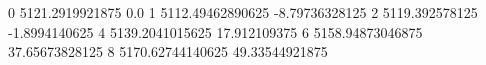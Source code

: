 0 5121.2919921875 0.0
1 5112.49462890625 -8.79736328125
2 5119.392578125 -1.8994140625
4 5139.2041015625 17.912109375
6 5158.94873046875 37.65673828125
8 5170.62744140625 49.33544921875
